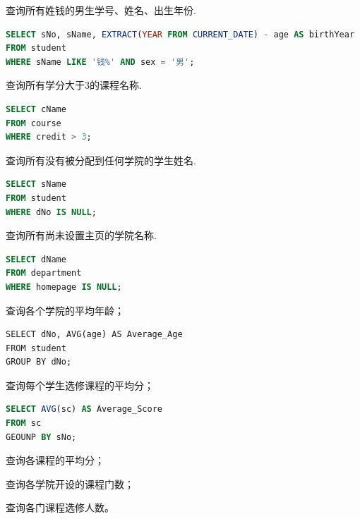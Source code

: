 \documentclass[10pt,UTF8]{book} %
\begin{document}
\begin{example}
    查询所有姓钱的男生学号、姓名、出生年份.
    \begin{lstlisting}[language=SQL]
SELECT sNo, sName, EXTRACT(YEAR FROM CURRENT_DATE) - age AS birthYear
FROM student
WHERE sName LIKE '钱%' AND sex = '男';
    \end{lstlisting}
\end{example}

\begin{example}
    查询所有学分大于3的课程名称.
    \begin{lstlisting}[language=SQL]
SELECT cName
FROM course
WHERE credit > 3;
    \end{lstlisting}
\end{example}


\begin{example}
    查询所有没有被分配到任何学院的学生姓名.
    \begin{lstlisting}[language=SQL]
SELECT sName
FROM student
WHERE dNo IS NULL;
    \end{lstlisting}
\end{example}
\begin{example}
    查询所有尚未设置主页的学院名称.
    \begin{lstlisting}[language=SQL]
SELECT dName
FROM department
WHERE homepage IS NULL;
    \end{lstlisting}
\end{example}

\begin{example}
    查询各个学院的平均年龄；
    \begin{lstlisting}
SELECT dNo, AVG(age) AS Average_Age
FROM student
GROUP BY dNo;
    \end{lstlisting}
\end{example}

\begin{example}
    查询每个学生选修课程的平均分；
    \begin{lstlisting}[language=SQL]
SELECT AVG(sc) AS Average_Score
FROM sc
GEOUNP BY sNo;
    \end{lstlisting}
\end{example}
\begin{example}
    查询各课程的平均分；
\end{example}
\begin{example}
    查询各学院开设的课程门数；
\end{example}
\begin{example}
    查询各门课程选修人数。
\end{example}
\end{document}
